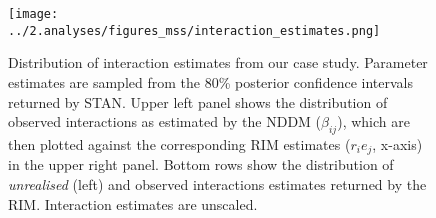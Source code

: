 \documentclass[a4,12pt]{article}
\begin{document}
    \begin{figure}[H]
        \texttt{[image: ../2.analyses/figures\_mss/interaction\_estimates.png]}
        \caption{Distribution of interaction estimates from our case study. Parameter estimates are sampled from the 80\% posterior confidence intervals returned by STAN. Upper left panel shows the distribution of observed interactions as estimated by the NDDM ($\beta_{ij}$), which are then plotted against the corresponding RIM estimates ($r_i e_j$, x-axis) in the upper right panel. Bottom rows show the distribution of \textit{unrealised} (left) and observed interactions estimates returned by the RIM. Interaction estimates are unscaled.}
        \label{fig:adist}
    \end{figure}
\end{document}
